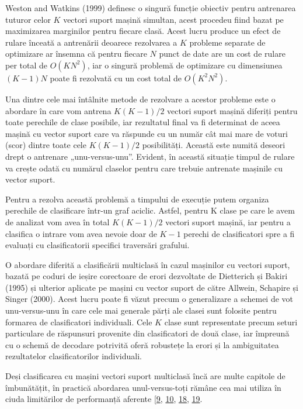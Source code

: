 Weston and Watkins (1999) definesc o singură funcție obiectiv pentru antrenarea tuturor celor $K$ vectori suport mașină simultan, acest procedeu fiind bazat pe maximizarea marginilor pentru fiecare clasă. Acest lucru produce un efect de rulare înceată a antrenării deoarece rezolvarea a $K$ probleme separate de optimizare ar însemna că pentru fiecare $N$ punct de date are un cost de rulare per total de $O(KN^2)$, iar o singură problemă de optimizare cu dimensiunea $(K - 1)N$ poate fi rezolvată cu un cost total de $O(K^2N^2)$.

Una dintre cele mai întâlnite metode de rezolvare a acestor probleme este o abordare în care vom antrena $K(K-1)/2$ vectori suport mașină diferiți pentru toate perechile de clase posibile, iar rezultatul final va fi determinat de aceea mașină cu vector suport care va răspunde cu un număr cât mai mare de voturi (scor) dintre toate cele $K(K-1)/2$ posibilități. Această este numită deseori drept o antrenare „unu-versus-unu”. Evident, în această situație timpul de rulare va crește odată cu numărul claselor pentru care trebuie antrenate mașinile cu vector suport.

Pentru a rezolva această problemă a timpului de execuție putem organiza perechile de clasificare într-un graf aciclic. Astfel, pentru K clase pe care le avem de analizat vom avea în total $K(K-1)/2$ vectori suport mașină, iar pentru a clasifica o intrare vom avea nevoie doar de $K-1$ perechi de clasificatori spre a fi evaluați cu clasificatorii specifici traversări grafului.

O abordare diferită a clasificării multiclasă în cazul mașinilor cu vectori suport, bazată pe coduri de ieșire corectoare de erori dezvoltate de Dietterich și Bakiri (1995) și ulterior aplicate pe mașini cu vector suport de către Allwein, Schapire și Singer (2000). 
Acest lucru poate fi văzut precum o generalizare a schemei de vot unu-versus-unu în care cele mai generale părți ale clasei sunt folosite pentru formarea de clasificatori individuali.
Cele $K$ clase sunt representate precum seturi particulare de răspunsuri provenite din clasificatori de două clase, iar împreună cu o schemă de decodare potrivită oferă robustețe la erori și la ambiguitatea rezultatelor clasificatorilor individuali.

Deși clasificarea cu mașini vectori suport multiclasă încă are multe capitole de îmbunătățit, în practică abordarea unul-versus-toți rămâne cea mai utiliza în ciuda limitărilor de performanță aferente \hyperlink{ErinAllweinRobertSchapireYoramSinger}{[9}, \hyperlink{JasonWestonSimonWatkins}{10}, \hyperlink{ThomasDietterichGhulumBakiri}{18}, \hyperlink{VladimirVapnik}{19}.

